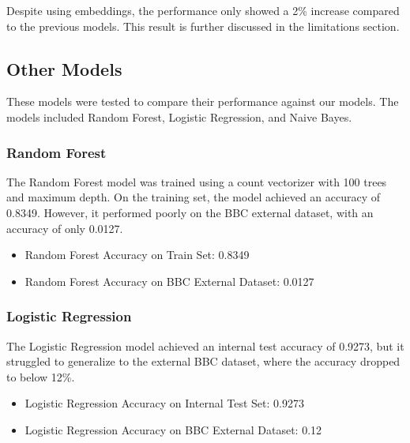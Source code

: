 \documentclass[sigconf]{acmart}
\begin{document}
Despite using embeddings, the performance only showed a 2\% increase compared to the previous models. This result is further discussed in the limitations section.


\subsection{Other Models}

These models were tested to compare their performance against our models. The models included Random Forest, Logistic Regression, and Naive Bayes.

\subsubsection{Random Forest}

The Random Forest model was trained using a count vectorizer with 100 trees and maximum depth. On the training set, the model achieved an accuracy of 0.8349. However, it performed poorly on the BBC external dataset, with an accuracy of only 0.0127.

\begin{itemize}
    \item Random Forest Accuracy on Train Set: 0.8349
    \item Random Forest Accuracy on BBC External Dataset: 0.0127
\end{itemize}

\subsubsection{Logistic Regression}

The Logistic Regression model achieved an internal test accuracy of 0.9273, but it struggled to generalize to the external BBC dataset, where the accuracy dropped to below 12\%.

\begin{itemize}
    \item Logistic Regression Accuracy on Internal Test Set: 0.9273
    \item Logistic Regression Accuracy on BBC External Dataset: 0.12
\end{itemize}
\end{document}
